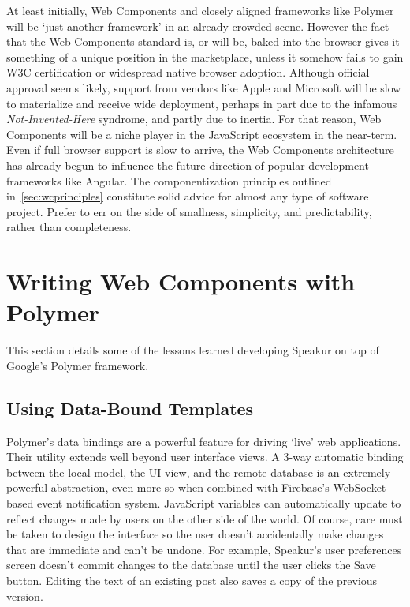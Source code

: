At least initially, Web Components and closely aligned frameworks like Polymer will be `just another framework' in an already crowded scene. 
However the fact that the Web Components standard is, or will be, baked into the browser gives it something of a unique position in the marketplace, 
unless it somehow fails to gain W3C certification or widespread native browser adoption.
Although official approval seems likely, 
support from vendors like Apple and Microsoft will be slow to materialize and receive wide deployment, 
perhaps in part due to the infamous \textit{Not-Invented-Here} syndrome,
and partly due to inertia.
For that reason, Web Components will be a niche player in the JavaScript ecosystem in the near-term.
Even if full browser support is slow to arrive, the Web Components architecture has already begun to influence the future direction of popular development frameworks like Angular.
The componentization principles outlined in~\cref{sec:wcprinciples} constitute solid advice for almost any type of software project.
Prefer to err on the side of smallness, simplicity, and predictability, rather than completeness.

\section{Writing Web Components with Polymer}
This section details some of the lessons learned developing Speakur on top of Google's Polymer framework.

\subsection{Using Data-Bound Templates}
Polymer's data bindings are a powerful feature for driving `live' web applications.
Their utility extends well beyond user interface views.
A 3-way automatic binding between the local model, the UI view, and the remote database is an extremely powerful abstraction,
even more so when combined with Firebase's 
Web\-Socket-based event notification system.
JavaScript variables can automatically update to reflect changes made by users on the other side of the world.
Of course, care must be taken to design the interface so the user doesn't accidentally make changes that are immediate and can't be undone. 
For example, Speakur's user preferences screen doesn't commit changes to the database until the user clicks the Save button.
Editing the text of an existing post also saves a copy of the previous version.

